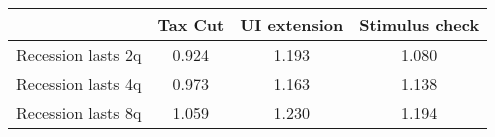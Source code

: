 \begin{tabular}{@{}lccc@{}} 
\toprule 
& Tax Cut    & UI extension    & Stimulus check    \\  \midrule 
Recession lasts 2q &0.924  & 1.193  & 1.080     \\ 
Recession lasts 4q &0.973  & 1.163  & 1.138     \\ 
Recession lasts 8q &1.059  & 1.230  & 1.194     \\ 
\end{tabular}  
